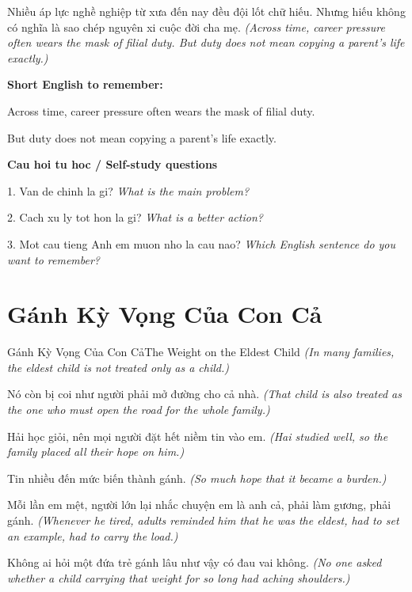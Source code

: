 \begin{baihoc}
Nhiều áp lực nghề nghiệp từ xưa đến nay đều đội lốt chữ hiếu. Nhưng hiếu không có nghĩa là sao chép nguyên xi cuộc đời cha mẹ.
\textit{(Across time, career pressure often wears the mask of filial duty. But duty does not mean copying a parent’s life exactly.)}
\end{baihoc}

\begin{ghinhoanh}
\textbf{Short English to remember:}

Across time, career pressure often wears the mask of filial duty.

But duty does not mean copying a parent’s life exactly.

\end{ghinhoanh}

\begin{tuhocnhanh}
\textbf{Cau hoi tu hoc / Self-study questions}

1. Van de chinh la gi? \textit{What is the main problem?}

2. Cach xu ly tot hon la gi? \textit{What is a better action?}

3. Mot cau tieng Anh em muon nho la cau nao? \textit{Which English sentence do you want to remember?}
\end{tuhocnhanh}
\ngancach

\section{Gánh Kỳ Vọng Của Con Cả}
\begin{truyen}{Gánh Kỳ Vọng Của Con Cả}{The Weight on the Eldest Child}
\textit{(In many families, the eldest child is not treated only as a child.)}

Nó còn bị coi như người phải mở đường cho cả nhà.
\textit{(That child is also treated as the one who must open the road for the whole family.)}

Hải học giỏi, nên mọi người đặt hết niềm tin vào em.
\textit{(Hai studied well, so the family placed all their hope on him.)}

Tin nhiều đến mức biến thành gánh.
\textit{(So much hope that it became a burden.)}

Mỗi lần em mệt, người lớn lại nhắc chuyện em là anh cả, phải làm gương, phải gánh.
\textit{(Whenever he tired, adults reminded him that he was the eldest, had to set an example, had to carry the load.)}

Không ai hỏi một đứa trẻ gánh lâu như vậy có đau vai không.
\textit{(No one asked whether a child carrying that weight for so long had aching shoulders.)}

\end{truyen}

